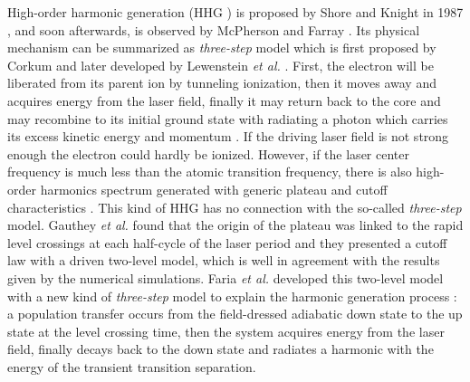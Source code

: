 \documentclass[10pt,letterpaper]{article}
\begin{document}
High-order harmonic generation (HHG ) is proposed by Shore and Knight in 1987 \cite{Shore-HHG-Origin-JPB-1987}, and soon afterwards, is observed by McPherson \cite{McPherson-Early-HHG-JOSAB-1987} and Farray \cite{Ferray-Early-HHG-JPB-1988}. Its physical mechanism can be summarized as \emph{three-step} model which is first proposed by Corkum \cite{Corkum-PRL-1993} and later developed by Lewenstein \emph{et al.} \cite{Lewenstein-SFA-PRA-1994}. First, the electron will be liberated from its parent ion by tunneling ionization, then it moves away and acquires energy from the laser field, finally it may return back to the core and may recombine to its initial ground state with radiating a photon which carries its excess kinetic energy and momentum \cite{1997Review}. If the driving laser field is not strong enough the electron could hardly be ionized. However, if the laser center frequency is much less than the atomic transition frequency, there is also high-order harmonics spectrum generated with generic plateau and cutoff characteristics \cite{Sundaram-Early-Two-Level-PRA-1990,Ivanov-Early-Two-Level-PRA-1993,Kaplan-Early-Two-Level-PRA-1994,Gauthey-Early-Two-Level-PRA-1997}. This kind of HHG has no connection with the so-called \emph{three-step} model. Gauthey \emph{et al.} \cite{Gauthey-Early-Two-Level-PRA-1997} found that the origin of the plateau was linked to the rapid level crossings at each half-cycle of the laser period and they presented a cutoff law with a driven two-level model, which is well in agreement with the results given by the numerical simulations. Faria \emph{et al.} \cite{Faria-Two-Level-Three-Step-PRA-2002} developed this two-level model with a new kind of \emph{three-step} model to explain the harmonic generation process : a population transfer occurs from the field-dressed adiabatic down state to the up state at the level crossing time, then the system acquires energy from the laser field, finally decays back to the down state and radiates a harmonic with the energy of the transient transition separation. 
\end{document}
